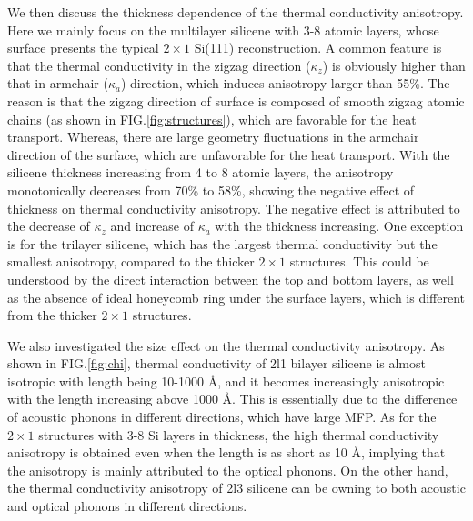 \documentclass[aps,prb,twocolumn,showpacs,amsmath,amssymb]{revtex4-1}
\newcommand{\angstrom}{\mbox{\normalfont\AA}}
\begin{document}
We then discuss the thickness dependence of the thermal conductivity anisotropy. Here we mainly focus on the multilayer silicene with 3-8 atomic layers, whose surface presents the typical $2 \times 1$ Si(111) reconstruction.   A common feature is that the thermal conductivity in the zigzag direction ($\kappa_z$) is obviously  higher than that  in armchair ($\kappa_a$) direction, which induces anisotropy larger than 55\%.
The reason is that the zigzag direction of surface is composed of smooth zigzag atomic chains (as shown in FIG.\ref{fig:structures}), which are favorable for the heat transport. Whereas,  there are large geometry fluctuations in the armchair direction of the surface, which are unfavorable for the heat transport.
With the silicene thickness increasing from 4 to 8 atomic layers, the anisotropy monotonically decreases from 70\% to 58\%, showing the negative  effect of thickness on  thermal conductivity anisotropy. The negative  effect  is attributed to the decrease of $\kappa_z$ and increase of $\kappa_a$  with the  thickness increasing.
One exception is for the trilayer silicene, which has the largest thermal conductivity  but the smallest  anisotropy, compared to the thicker  $2\times1$ structures.  This could be understood by the direct interaction between the top and bottom layers, as well as the absence of ideal honeycomb ring under the surface layers, which is different from the thicker $2\times 1$ structures\cite{Guo2015Structural}.


We also investigated the size effect on the thermal conductivity anisotropy. As shown in FIG.\ref{fig:chi}, thermal conductivity of  2l1 bilayer silicene is almost isotropic  with length being 10-1000 \angstrom, and it becomes increasingly anisotropic with the length increasing  above 1000  \angstrom. This is essentially due to the difference of acoustic phonons in different directions,  which have large MFP.  As for the $2\times1$ structures with 3-8 Si layers in thickness, the high thermal conductivity anisotropy is obtained even when the length is as short as 10 \angstrom, implying that the anisotropy is  mainly attributed to the optical phonons. On the other hand, the thermal conductivity anisotropy of 2l3 silicene can be owning to both acoustic and  optical phonons in different directions.
\end{document}
